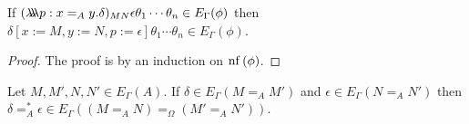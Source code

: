 \begin{lemma}
\label{lm:Ered}
If $(\lambda \!\! \lambda \!\! \lambda p:x =_A y. \delta)_{M N} \epsilon \theta_1 \cdots \theta_n \in E_\Gamma(\phi)$
then $\delta[x:=M, y:=N, p:=\epsilon] \theta_1 \cdots \theta_n \in E_\Gamma(\phi)$.
\end{lemma}

\begin{proof}
The proof is by an induction on $\mathrm{nf} \left( {\phi} \right)$.
\end{proof}

\begin{lemma}
\label{lm:eqstar}
Let $M, M', N, N' \in E_\Gamma(A)$.
If $\delta \in E_\Gamma(M =_A M')$ and $\epsilon \in E_\Gamma(N =_A N')$ then
$\delta =_A^* \epsilon \in E_\Gamma((M =_A N) =_\Omega (M' =_A N'))$.
\end{lemma}

